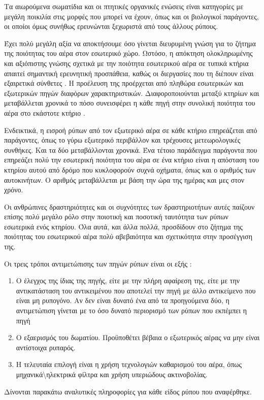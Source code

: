 Τα αιωρούμενα σωματίδια και οι πτητικές οργανικές ενώσεις είναι κατηγορίες με μεγάλη ποικιλία στις μορφές που μπορεί να έχουν, όπως και οι βιολογικοί παράγοντες, οι οποίοι όμως συνήθως ερευνώνται ξεχωριστά από τους άλλους ρύπους.

Έχει πολύ μεγάλη αξία να αποκτήσουμε όσο γίνεται διευρυμένη γνώση για το ζήτημα της ποιότητας του αέρα στον εσωτερικό χώρο.
Ωστόσο, η απόκτηση ολοκληρωμένης και αξιόπιστης γνώσης σχετικά με την ποιότητα εσωτερικού αέρα σε τυπικά κτήρια απαιτεί σημαντική ερευνητική προσπάθεια,
καθώς οι διεργασίες που τη διέπουν είναι εξαιρετικά σύνθετες \cite{DAI2023164858}.
Η προέλευση της προέρχεται από πληθώρα εσωτερικών και εξωτερικών πηγών διαφόρων χαρακτηριστικών.
Διαφοροποιούνται μεταξύ κτηρίων και μεταβάλλεται χρονικά το πόσο συνεισφέρει η κάθε πηγή στην συνολική ποιότητα του αέρα στο εκάστοτε κτήριο .

Ενδεικτικά, η εισροή ρύπων από τον εξωτερικό αέρα σε κάθε κτήριο επηρεάζεται από παράγοντες, όπως το γύρω εξωτερικό περιβάλλον και τρέχουσες μετεωρολογικές συνθήκες.
Και τα δύο μεταβάλλονται χρονικά.
Ένα τέτοιο παράδειγμα παράγοντα που επηρεάζει πολύ την εσωτερική ποιότητα του αέρα σε ένα κτήριο είναι η απόσταση του κτηρίου αυτού από δρόμο που κυκλοφορούν συχνά οχήματα, όπως και ο αριθμός των αυτοκινήτων.
Ο αριθμός μεταβάλλεται με βάση την ώρα της ημέρας και μες στον χρόνο.

Οι ανθρώπινες δραστηριότητες και οι συχνότητες των δραστηριοτήτων αυτές παίζουν επίσης πολύ μεγάλο ρόλο στην ποιοτική και ποσοτική ταυτότητα των ρύπων εσωτερικά ενός κτηρίου.
Όλα αυτά, και άλλα πολλά, προσδίδουν στο ζήτημα της ποιότητας του εσωτερικού αέρα πολύ αβεβαιότητα και σχετικότητα στην προσέγγιση της.

Οι τρεις τρόποι αντιμετώπισης των πηγών ρύπων είναι οι εξής \cite{Luengas2015}:
\begin{enumerate}

\item O έλεγχος της ίδιας της πηγής, είτε με την πλήρη αφαίρεση της, είτε με την αντικατάσταση του αντικειμένου που αποτελεί την πηγή με άλλο αντικείμενο που είναι μη ρυπογόνο.
Αν δεν είναι δυνατό ένα από τα προηγούμενα δύο, η αντιμετώπιση γίνεται με το όσο δυνατό περιορισμό των ρύπων που εκπέμπει η πηγή
\item O εξαερισμός του δωματίου.
Προϋποθέτει βέβαια ο εξωτερικός αέρας να μην είναι αντίστοιχα ρυπαρός.
\item  Η τελευταία επιλογή είναι η χρήση τεχνολογιών καθαρισμού του αέρα, όπως μηχανικά{\textbackslash}ηλεκτρικά φίλτρα και χρήση υπεριώδους ακτινοβολίας.

\end{enumerate}

\FloatBarrier 
Δίνονται παρακάτω αναλυτικές πληροφορίες για κάθε είδος ρύπου που αναφέρθηκε.


